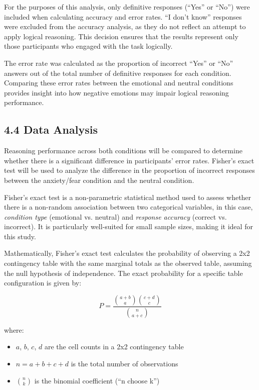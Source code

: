 \documentclass[12pt]{article}
\begin{document}
For the purposes of this analysis, only definitive responses (“Yes” or “No”) were included when calculating accuracy and error rates. “I don’t know” responses were excluded from the accuracy analysis, as they do not reflect an attempt to apply logical reasoning. This decision ensures that the results represent only those participants who engaged with the task logically.

The error rate was calculated as the proportion of incorrect “Yes” or “No” answers out of the total number of definitive responses for each condition. Comparing these error rates between the emotional and neutral conditions provides insight into how negative emotions may impair logical reasoning performance.
\subsection*{4.4 Data Analysis}

Reasoning performance across both conditions will be compared to determine whether there is a significant difference in participants’ error rates. Fisher’s exact test will be used to analyze the difference in the proportion of incorrect responses between the anxiety/fear condition and the neutral condition.

Fisher’s exact test is a non-parametric statistical method used to assess whether there is a non-random association between two categorical variables, in this case, \textit{condition type} (emotional vs. neutral) and \textit{response accuracy} (correct vs. incorrect). It is particularly well-suited for small sample sizes, making it ideal for this study.

Mathematically, Fisher’s exact test calculates the probability of observing a 2x2 contingency table with the same marginal totals as the observed table, assuming the null hypothesis of independence. The exact probability for a specific table configuration is given by:

\[
P = \frac{ \binom{a+b}{a} \binom{c+d}{c} }{ \binom{n}{a+c} }
\]

where:
\begin{itemize}
    \item $a$, $b$, $c$, $d$ are the cell counts in a 2x2 contingency table
    \item $n = a + b + c + d$ is the total number of observations
    \item $\binom{n}{k}$ is the binomial coefficient (``n choose k'')
\end{itemize}
\end{document}
